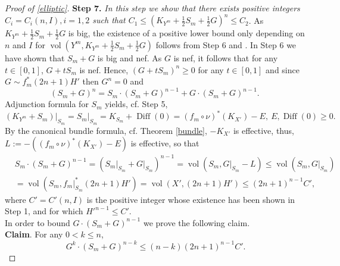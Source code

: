 \documentclass{amsart}[12pt,a4paper]
\theoremstyle{definition}
\DeclareMathOperator{\vol}{\mathrm{vol}}
\DeclareMathOperator{\diff}{\mathrm{Diff}}
\begin{document}
\begin{proof}[Proof of \ref{elliptic}]
{\bf Step 7.} {\it In this step we show that there exists positive integers $C_i= C_i(n, I), i=1, 2$ such that $C_1 \leq (K_{Y^m}+\frac 1 2 S_m+\frac 1 2 G)^{n} \leq C_2$}.
\newline
As $K_{Y^m}+\frac 1 2 S_m+\frac 1 2 G$ is big, the existence of a positive lower bound only depending on $n$ and $I$ for $\vol(Y^m, K_{Y^m}+\frac 1 2 S_m+\frac 1 2 G)$ follows from Step 6 and \cite[Theorem 1.3]{HMX14}.
In Step 6 we have shown that $S_m+G$ is big and nef.
As $G$ is nef, it follows that for any $t \in [0, 1]$,  $G+tS_m$ is nef.
Hence, $(G+tS_m)^n \geq 0$ for any $t \in [0, 1]$ and since $G \sim f^\ast_m (2n+1) H'$ then $G^n =0$ and
\[
(S_m+G)^n=S_m \cdot (S_m+G)^{n-1} + G \cdot (S_m+G)^{n-1}.
\]
Adjunction formula for $S_m$ yields, cf. Step 5,
\[
(K_{Y^m} + S_m)\vert_{S_m} = S_m\vert_{S_m} = K_{S_m} + \diff(0) = (f_m \circ \nu)^\ast (K_{X'}) - E, \ E, \diff(0) \geq 0.
\]
By the canonical bundle formula, cf. Theorem \ref{bundle}, $-K_{X'}$ is effective, thus, $L:=-((f_m \circ \nu)^\ast (K_{X'}) - E)$ is effective, so that
\begin{align*}
& S_m \cdot (S_m+G)^{n-1} = (S_m\vert_{S_m}+G\vert_{S_m})^{n-1} = \vol(S_m, G\vert_{S_m} - L) \leq \vol(S_m, G\vert_{S_m}) \\
& = \vol(S_m, f_m\vert_{S_m}^\ast (2n+1)H') = \vol(X',(2n+1)H') \leq (2n+1)^{n-1} C',
\end{align*}
where $C'= C'(n, I)$ is the positive integer whose existence has been shown in Step 1, and for which $H'^{n-1} \leq C'$.\\
In order to bound $G \cdot (S_m+G)^{n-1}$ we prove the following claim.\\

{\bf Claim}. 
For any $0<k \leq n$,
\[ 
\ G^k\cdot (S_m+G)^{n-k}\leq (n-k)(2n+1)^{n-1} C'.
\]


\end{proof}
\end{document}
